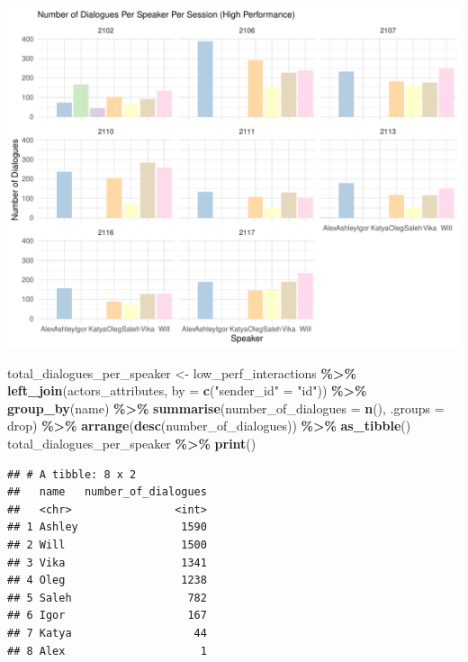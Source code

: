 \documentclass[
]{article}
\newenvironment{Shaded}{\begin{snugshade}}{\end{snugshade}}
\newcommand{\AttributeTok}[1]{\textcolor[rgb]{0.13,0.29,0.53}{#1}}
\newcommand{\FunctionTok}[1]{\textcolor[rgb]{0.13,0.29,0.53}{\textbf{#1}}}
\newcommand{\NormalTok}[1]{#1}
\newcommand{\OtherTok}[1]{\textcolor[rgb]{0.56,0.35,0.01}{#1}}
\newcommand{\SpecialCharTok}[1]{\textcolor[rgb]{0.81,0.36,0.00}{\textbf{#1}}}
\newcommand{\StringTok}[1]{\textcolor[rgb]{0.31,0.60,0.02}{#1}}
\begin{document}
\begin{center}\includegraphics{low_surv_analysis_files/figure-latex/unnamed-chunk-4-1} \end{center}

\begin{Shaded}
\begin{Highlighting}[]
\NormalTok{total\_dialogues\_per\_speaker }\OtherTok{\textless{}{-}}\NormalTok{ low\_perf\_interactions }\SpecialCharTok{\%\textgreater{}\%}
  \FunctionTok{left\_join}\NormalTok{(actors\_attributes, }\AttributeTok{by =} \FunctionTok{c}\NormalTok{(}\StringTok{"sender\_id"} \OtherTok{=} \StringTok{"id"}\NormalTok{)) }\SpecialCharTok{\%\textgreater{}\%}
  \FunctionTok{group\_by}\NormalTok{(name) }\SpecialCharTok{\%\textgreater{}\%}
  \FunctionTok{summarise}\NormalTok{(}\AttributeTok{number\_of\_dialogues =} \FunctionTok{n}\NormalTok{(), }\AttributeTok{.groups =} \StringTok{\textquotesingle{}drop\textquotesingle{}}\NormalTok{) }\SpecialCharTok{\%\textgreater{}\%}
  \FunctionTok{arrange}\NormalTok{(}\FunctionTok{desc}\NormalTok{(number\_of\_dialogues)) }\SpecialCharTok{\%\textgreater{}\%}  \FunctionTok{as\_tibble}\NormalTok{() }
\NormalTok{total\_dialogues\_per\_speaker }\SpecialCharTok{\%\textgreater{}\%} \FunctionTok{print}\NormalTok{()}
\end{Highlighting}
\end{Shaded}

\begin{verbatim}
## # A tibble: 8 x 2
##   name   number_of_dialogues
##   <chr>                <int>
## 1 Ashley                1590
## 2 Will                  1500
## 3 Vika                  1341
## 4 Oleg                  1238
## 5 Saleh                  782
## 6 Igor                   167
## 7 Katya                   44
## 8 Alex                     1
\end{verbatim}
\end{document}
